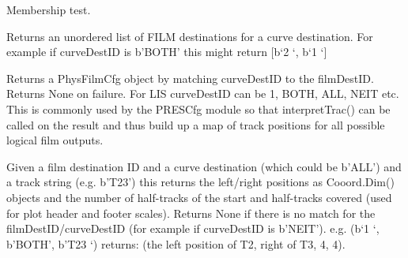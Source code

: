 \documentclass[letterpaper,10pt,english]{sphinxmanual}
\begin{document}
\begin{fulllineitems}

\begin{fulllineitems}
\label{\detokenize{ref/util/plot/FILMCfg:TotalDepth.util.plot.FILMCfg.FilmCfg.__contains__}}
Membership test.

\end{fulllineitems}


\begin{fulllineitems}
\label{\detokenize{ref/util/plot/FILMCfg:TotalDepth.util.plot.FILMCfg.FilmCfg.retAllFILMDestS}}
Returns an unordered list of FILM destinations for a curve destination.
For example if curveDestID is b’BOTH’ this might return {[}b‘2   ‘, b‘1   ‘{]}

\end{fulllineitems}


\begin{fulllineitems}
\label{\detokenize{ref/util/plot/FILMCfg:TotalDepth.util.plot.FILMCfg.FilmCfg.retFILMDest}}
Returns a PhysFilmCfg object by matching curveDestID to the filmDestID.
Returns None on failure. For LIS curveDestID can be 1, BOTH, ALL, NEIT etc.
This is commonly used by the PRESCfg module so that interpretTrac() can
be called on the result and thus build up a map of track positions for
all possible logical film outputs.

\end{fulllineitems}


\begin{fulllineitems}
\label{\detokenize{ref/util/plot/FILMCfg:TotalDepth.util.plot.FILMCfg.FilmCfg.interpretTrac}}
Given a film destination ID and a curve destination (which could be
b’ALL’) and a track string (e.g. b’T23’) this returns the left/right
positions as Cooord.Dim() objects and the number of half-tracks of the
start and half-tracks covered (used for plot header and footer scales).
Returns None if there is no match for the filmDestID/curveDestID (for
example if curveDestID is b’NEIT’). 
e.g. (b‘1   ‘, b’BOTH’, b’T23 ‘) returns:
(the left position of T2, right of T3, 4, 4).


\end{fulllineitems}
\end{fulllineitems}
\end{document}
